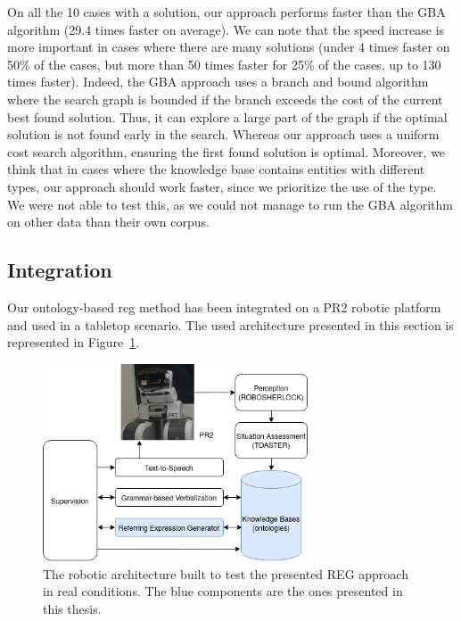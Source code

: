 \documentclass[a4paper,11pt,twoside]{StyleThese}
\begin{document}
On all the 10 cases with a solution, our approach performs faster than the GBA algorithm (29.4 times faster on average). We can note that the speed increase is more important in cases where there are many solutions (under 4 times faster on 50\% of the cases, but more than 50 times faster for 25\% of the cases, up to 130 times faster). 
Indeed, the GBA approach uses a branch and bound algorithm where the search graph is bounded if the branch exceeds the cost of the current best found solution. Thus, it can explore a large part of the graph if the optimal solution is not found early in the search. Whereas our approach uses a uniform cost search algorithm, ensuring the first found solution is optimal.
Moreover, we think that in cases where the knowledge base contains entities with different types, our approach should work faster, since we prioritize the use of the type. We were not able to test this, as we could not manage to run the GBA algorithm on other data than their own corpus.

\subsection{Integration}

Our ontology-based \acrshort{reg} method has been integrated on a PR2 robotic platform and used in a tabletop scenario. The used architecture presented in this section is represented in Figure~\ref{fig:regarchi}.

\begin{figure}[hbtp]
\centering
\includegraphics[width=0.7\textwidth]{figures/chapter3/ArchiREG.png}
\caption{The robotic architecture built to test the presented REG approach in real conditions. The blue components are the ones presented in this thesis.}
\label{fig:regarchi}
\end{figure}
\end{document}
